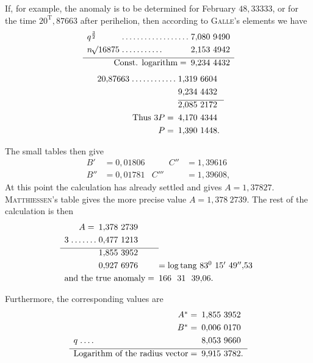 \par
\noindent\hspace*{\parindent}If, for example, the anomaly is to be determined for February \(48{,}33333\), or for the time \(20^{\mathrm T}{,}87663\) after perihelion, then according to \textsc{Galle}'s elements we have
\[
\begin{array}{l@{\;}l@{\;}l}
q^{\frac32}&.\,.\,.\,.\,.\,.\,.\,.\,.\,.\,.\,.\,.\,.\,.\,.\,.\,.&7{,}080\ 9490\\[3pt]
n\BareRoot{16875}&.\,.\,.\,.\,.\,.\,.\,.\,.\,.\,.&2{,}153\ 4942\\[3pt]\hline
\multicolumn{2}{r}{\text{Const. logarithm}=}&9{,}234\ 4432
\end{array}
\]
\[
\begin{array}{r@{\;}l@{\;}l}
20{,}87663&.\,.\,.\,.\,.\,.\,.\,.\,.\,.\,.\,.&1{,}319\ 6604\\[3pt]
&&9{,}234\ 4432\\[3pt]\cline{3-3}
&&2{,}085\ 2172\\[3pt]
\multicolumn{2}{r}{\text{Thus }3P=}&4{,}170\ 4344\\[3pt]
\multicolumn{2}{r}{P=}&1{,}390\ 1448.
\end{array}
\]
\par
\noindent\hspace*{\parindent}The small tables then give
\[
\begin{aligned}
B'&=0{,}01806&\qquad C''&=1{,}39616\\[3pt]
B''&=0{,}01781&C'''&=1{,}39608,
\end{aligned}
\]
At this point the calculation has already settled and gives \(A=1{,}37827\). \textsc{Matthiessen}'s table gives the more precise value \(A=1{,}378\ 2739.\) The rest of the calculation is then
\[
\begin{array}{r@{\;}l@{\;}l@{\quad}l}
\multicolumn{2}{r}{A=}&1{,}378\ 2739&\\[3pt]
3&.\,.\,.\,.\,.\,.\,.&0{,}477\ 1213&\\[3pt]\cline{1-3}
&&1{,}855\ 3952&\\[3pt]
&&0{,}927\ 6976&=\log\mathrm{tang}\ 83^0\ 15'\ 49''{,}53\\[3pt]
\multicolumn{3}{r}{\text{and the true anomaly}=}&166\ \ 31\ \ 39{,}06.
\end{array}
\]
\par
\noindent\hspace*{\parindent}Furthermore, the corresponding values are
\[
\begin{array}{r@{\;}l@{\;}l}
\multicolumn{2}{r}{A^*=}&1{,}855\ 3952\\[3pt]
\multicolumn{2}{r}{B^*=}&0{,}006\ 0170\\[3pt]
q&.\,.\,.\,.&8{,}053\ 9660\\[3pt]\hline
\multicolumn{2}{r}{\text{Logarithm of the radius vector}=}&9{,}915\ 3782.
\end{array}
\]
